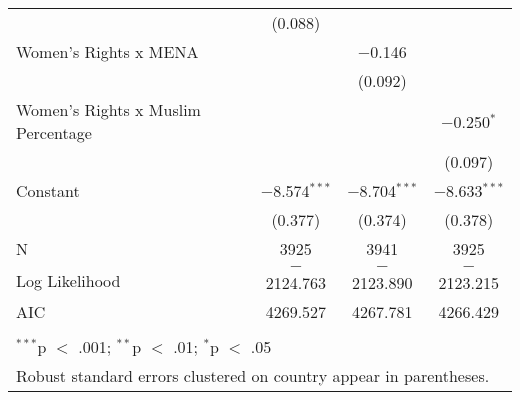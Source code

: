 \begin{table}[!htbp]
\begin{tabular}{@{\extracolsep{5pt}}lccc}
  & (0.088) &  &  \\ 
  Women's Rights x MENA &  & $-$0.146 &  \\ 
  &  & (0.092) &  \\ 
  Women's Rights x Muslim Percentage &  &  & $-$0.250$^{*}$ \\ 
  &  &  & (0.097) \\ 
  Constant & $-$8.574$^{***}$ & $-$8.704$^{***}$ & $-$8.633$^{***}$ \\ 
  & (0.377) & (0.374) & (0.378) \\ 
 N & 3925 & 3941 & 3925 \\ 
Log Likelihood & $-$2124.763 & $-$2123.890 & $-$2123.215 \\ 
AIC & 4269.527 & 4267.781 & 4266.429 \\ 
\hline \\[-1.8ex] 
\multicolumn{4}{l}{$^{***}$p $<$ .001; $^{**}$p $<$ .01; $^{*}$p $<$ .05} \\ 
\multicolumn{4}{l}{Robust standard errors clustered on country appear in parentheses.} \\ 
\end{tabular} 
\end{table} 

